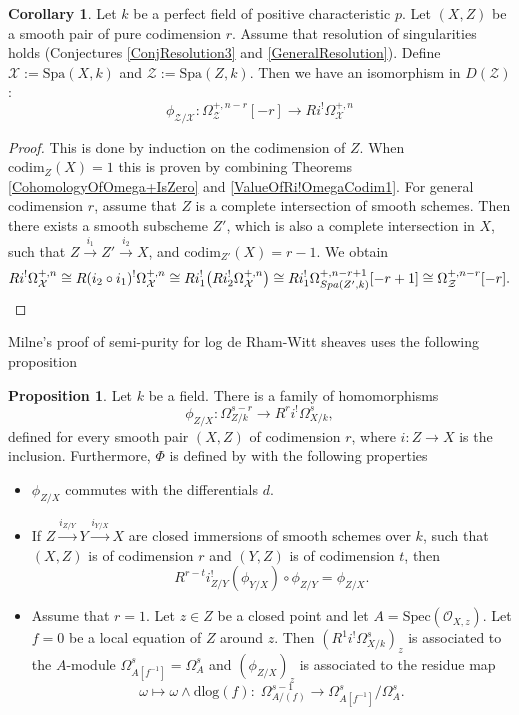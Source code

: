 \documentclass{amsart}
\def\Spa{\textrm{Spa}}
\def\Spec{\textrm{Spec}}
\theoremstyle{definition}
\newtheorem{proposition}[theorem]{Proposition}
\newtheorem{corollary}[theorem]{Corollary}
\newcommand\dlog{\mathrm{dlog}}
\numberwithin{equation}{section}
\begin{document}
\begin{corollary}\label{ValuesOfRi!Omega+}
	Let $k$ be a perfect field of positive characteristic $p$. Let $(X,Z)$ be a smooth pair of pure codimension $r$. Assume that resolution of singularities holds (Conjectures \ref{ConjResolution3} and \ref{GeneralResolution}). Define $\mathcal{X}:=\Spa(X,k)$ and $\mathcal{Z}:=\Spa(Z,k)$. Then we have an isomorphism in $D(\mathcal{Z})$:
	\[
	\phi_{\mathcal{Z}/\mathcal{X}}:\Omega_{\mathcal{Z}}^{+,n-r}[-r]\to Ri^!\Omega_{\mathcal{X}}^{+,n}
	\]
\end{corollary}
\renewcommand\qedsymbol{$\underset{\cref{ValuesOfRi!Omega+} \textrm{ when } Z \textrm{ is a complete intersection}}{\square}$}
\begin{proof}
	 This is done by induction on the codimension of $Z$. When $\textrm{codim}_Z(X)=1$ this is proven by combining Theorems \ref{CohomologyOfOmega+IsZero} and \ref{ValueOfRi!OmegaCodim1}. For general codimension $r$, assume that $Z$ is a complete intersection of smooth schemes. Then there exists a smooth subscheme $Z'$, which is also a complete intersection in $X$, such that
	 $Z\xrightarrow{i_1} Z' \xrightarrow{i_2} X $,  and $\textrm{codim}_{Z'}(X)=r-1$. 
	   We obtain
	 \[
	 	Ri^!\Omega^{+,n}_{\mathcal{X}}\cong R(i_2 \circ i_1)^!\Omega^{+,n}_{\mathcal{X}}\cong Ri_1^! \big(Ri_2^! \Omega^{+,n}_{\mathcal{X}}\big)\cong Ri_1^! \Omega^{+,n-r+1}_{\Spa(Z',k)}[-r+1]\cong \Omega^{+,n-r}_{\mathcal{Z}}[-r]. \qedhere
	 \]
\end{proof}
\renewcommand\qedsymbol{$\square$}
Milne's proof of semi-purity for log de Rham-Witt sheaves \cite[Proposition 2.1]{MilneValuesOfZeta} uses the following proposition
\begin{proposition}
	Let $k$ be a field. 
	There is a family of homomorphisms $$\phi_{Z/X}:\Omega^{s-r}_{Z/k}\to R^{r}i^!\Omega_{X/k}^s,$$
	defined for every smooth pair $(X,Z)$ of codimension $r$, where $i:Z\to X$ is the inclusion. Furthermore, $\Phi$ is defined by  with the following properties
	\begin{itemize}
		\item $\phi_{Z/X}$ commutes with the differentials $d$.
		\item If $Z\xrightarrow{i_{Z/Y}} Y\xrightarrow{i_{Y/X}} X$ are closed immersions of smooth schemes over $k$, such that $(X,Z)$ is of codimension $r$ and $(Y,Z)$ is of codimension $t$, then $$R^{r-t}i^!_{Z/Y}(\phi_{Y/X})\circ \phi_{Z/Y}=\phi_{Z/X}.$$
		\item Assume that $r=1$. Let $z\in Z$ be a closed point and let $A=\Spec(\mathcal{O}_{X,z})$. Let $f=0$ be a local equation of $Z$ around $z$. Then $(R^1i^!\Omega^s_{X/k})_z$ is associated to the $A$-module $\Omega^s_{A[f^{-1}]}=\Omega_A^s$ and $(\phi_{Z/X})_z$ is associated to the residue map
		\[
		\omega\mapsto \omega \wedge \dlog(f): \; \Omega_{A/(f)}^{s-1}\to \Omega_{A[f^{-1}]}^s/\Omega_A^s.
		\]
	\end{itemize} 
\end{proposition}
\end{document}
